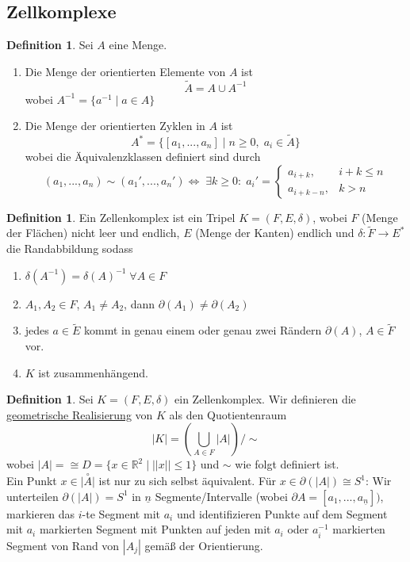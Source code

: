 \documentclass[a4paper, 12pt]{article}
\theoremstyle{plain}
\theoremstyle{definition}
\newtheorem{definition}[theorem]{Definition} %
\theoremstyle{lemma}
\theoremstyle{remark}
\theoremstyle{corollary}
\theoremstyle{example}
\begin{document}
	\subsection{Zellkomplexe}
	\begin{definition}
		Sei $A$ eine Menge. \begin{enumerate}
			\item Die Menge der orientierten Elemente von $A$ ist \[\tilde{A} = A \cup A^{-1}\] wobei $A^{-1} = \{a^{-1} \mid a \in A\}$
			\item Die Menge der orientierten Zyklen in $A$ ist \[A^* = \{[a_1,...,a_n] \mid n \geq 0, \; a_i \in \tilde{A}\}\] wobei die Äquivalenzklassen definiert sind durch \[(a_1,...,a_n) \sim (a_1',...,a_n') \Leftrightarrow \; \exists k \geq 0: \; a_i' = \begin{cases}
				a_{i+k},& i+k \leq n\\
				a_{i+k-n},& k > n
			\end{cases}\]
		\end{enumerate}
	\end{definition}
	\begin{definition}
		Ein Zellenkomplex ist ein Tripel $K = (F,E,\delta)$, wobei $F$ (Menge der Flächen) nicht leer und endlich, $E$ (Menge der Kanten) endlich und $\delta: \tilde{F} \to E^*$ die Randabbildung sodass \begin{enumerate}
			\item $\delta(A^{-1}) = \delta(A)^{-1} \; \forall A \in F$
			\item $A_1,A_2 \in F$, $A_1 \neq A_2$, dann $\partial(A_1) \neq \partial(A_2)$
			\item jedes $a \in \tilde{E}$ kommt in genau einem oder genau zwei Rändern $\partial(A)$, $A \in \tilde{F}$ vor.
			\item $K$ ist zusammenhängend.
		\end{enumerate}
	\end{definition}
	\begin{definition}
		Sei $K = (F,E,\delta)$ ein Zellenkomplex. Wir definieren die \underline{geometrische Realisierung} von $K$ als den Quotientenraum \[\left|K\right| = (\bigcup_{A \in F} \left|A\right|)/\sim\] wobei $\left|A\right| = \cong D = \{x \in \mathbb{R}^2 \mid ||x|| \leq 1\}$ und $\sim$ wie folgt definiert ist.\\
		Ein Punkt $x \in \overset{\circ}{\left|A\right|}$ ist nur zu sich selbst äquivalent. Für $x \in \partial(\left|A\right|) \cong S^1$: Wir unterteilen $\partial(\left|A\right|) = S^1$ in $\underline{n}$ Segmente/Intervalle (wobei $\partial A = [a_1,...,a_{\underline{n}}])$, markieren das $i$-te Segment mit $a_i$ und identifizieren Punkte auf dem Segment mit $a_i$ markierten Segment mit Punkten auf jeden mit $a_i$ oder $a_i^{-1}$ markierten Segment von Rand von $\left|A_j\right|$ gemäß der Orientierung.
	\end{definition}
\end{document}

